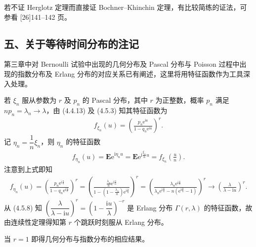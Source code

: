 \documentclass[../../main.tex]{subfiles}
\begin{document}
若不证 Herglotz 定理而直接证 Bochner--Khinchin 定理，有比较简练的证法，可参看 [26]141--142 页。

\subsection*{五、关于等待时间分布的注记}

第三章中对 Bernoulli 试验中出现的几何分布及 Pascal 分布与 Poisson 过程中出现的指数分布及 Erlang 分布的对应关系已有阐述，这里将用特征函数作为工具深入处理。

若 $\xi_n$ 服从参数为 $r$ 及 $p_n$ 的 Pascal 分布，其中 $r$ 为正整数，概率 $p_n$ 满足 $np_n=\lambda_n\to\lambda$，由 (4.4.13) 及 (4.5.3) 知其特征函数为
\begin{align}
f_{\xi_n}(u)=\left(\frac{p_n\mathrm{e}^{\mathrm{i}u}}{1-q_n\mathrm{e}^{\mathrm{i}u}}\right)^{r}.
\end{align}
记 $\eta_n=\dfrac1n\xi_n$，则 $\eta_n$ 的特征函数
\begin{align*}
f_{\eta_n}(u)=\boldsymbol{E}\mathrm{e}^{\mathrm{i}\eta_n u}=\boldsymbol{E}\mathrm{e}^{\mathrm{i}\frac{\xi_n}{n}u}=f_{\xi_n}\!\left(\frac{u}{n}\right).
\end{align*}
注意到上式即知
\begin{align*}
f_{\eta_n}(u)=\left(\frac{p_n\mathrm{e}^{\mathrm{i}\frac{u}{n}}}{1-q_n\mathrm{e}^{\mathrm{i}\frac{u}{n}}}\right)^{r}
=\left(\frac{\frac{\lambda_n}{n}\mathrm{e}^{\mathrm{i}\frac{u}{n}}}{1-\left(1-\frac{\lambda_n}{n}\right)\mathrm{e}^{\mathrm{i}\frac{u}{n}}}\right)^{r}
=\left(\frac{\lambda_n\mathrm{e}^{\mathrm{i}\frac{u}{n}}}{\lambda_n\mathrm{e}^{\mathrm{i}\frac{u}{n}}-n\left(\mathrm{e}^{\mathrm{i}\frac{u}{n}}-1\right)}\right)^{r}\to\left(\frac{\lambda}{\lambda-\mathrm{i}u}\right)^{r}.
\end{align*}
从 (4.5.8) 知 $\left(\dfrac{\lambda}{\lambda-\mathrm{i}u}\right)^{r}=\left(1-\dfrac{\mathrm{i}u}{\lambda}\right)^{-r}$ 是 Erlang 分布 $\Gamma(r,\lambda)$ 的特征函数，故由连续性定理得知第 $r$ 个跳跃时刻服从 Erlang 分布。

当 $r=1$ 即得几何分布与指数分布的相应结果。
\end{document}
